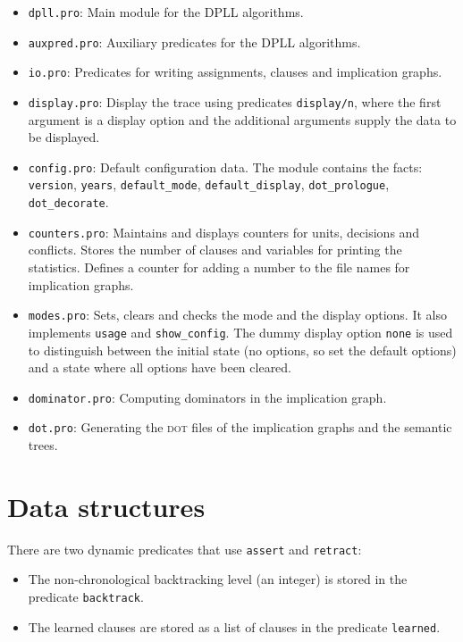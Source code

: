 \documentclass[11pt]{report}
\newcommand*{\p}[1]{\textup{\texttt{#1}}}
\newcommand*{\dt}{\textsc{dot}}
\begin{document}
\begin{itemize}
\item \p{dpll.pro}: Main module for the DPLL algorithms.\\

\item \p{auxpred.pro}: Auxiliary predicates for the DPLL algorithms. 

\item \p{io.pro}: Predicates for writing assignments, clauses and
implication graphs.

\item \p{display.pro}: Display the trace using predicates \p{display/n},
where the first argument is a display option and the additional
arguments supply the data to be displayed.

\item \p{config.pro}: Default configuration data. The module contains
the facts: \p{version}, \p{years}, \p{default\_mode},
\p{default\_display}, \p{dot\_prologue}, \p{dot\_decorate}.

\item \p{counters.pro}: Maintains and displays counters for units,
decisions and conflicts. Stores the number of clauses and variables for
printing the statistics. Defines a counter for adding a number to the
file names for implication graphs.

\item \p{modes.pro}: Sets, clears and checks the mode and the display
options. It also implements \p{usage} and \p{show\_config}. The dummy
display option \p{none} is used to distinguish between the initial state
(no options, so set the default options) and a state where all options
have been cleared.

\item \p{dominator.pro}: Computing dominators in the implication graph. 

\item \p{dot.pro}: Generating the \dt{} files of the implication graphs
and the semantic trees.
\end{itemize}

\newpage

\section{Data structures}

There are two dynamic predicates that use \p{assert} and \p{retract}:
\begin{itemize}
\item The non-chronological backtracking level (an integer) is stored in the
predicate \p{backtrack}.

\item The learned clauses are stored as a list of
clauses in the predicate \p{learned}.
\end{itemize}
\end{document}
